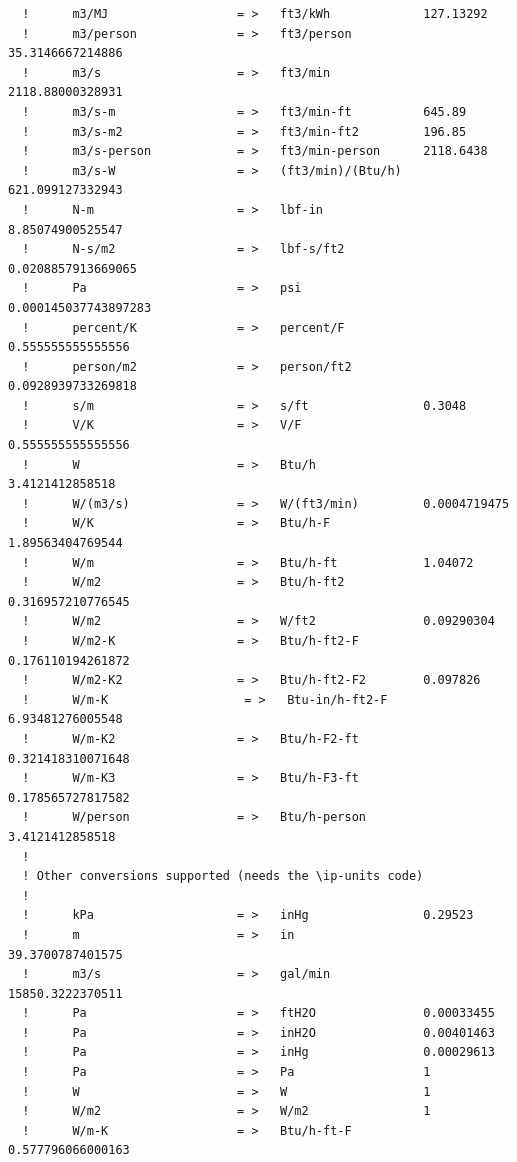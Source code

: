 \begin{lstlisting}
  !      m3/MJ                  = >   ft3/kWh             127.13292
  !      m3/person              = >   ft3/person          35.3146667214886
  !      m3/s                   = >   ft3/min             2118.88000328931
  !      m3/s-m                 = >   ft3/min-ft          645.89
  !      m3/s-m2                = >   ft3/min-ft2         196.85
  !      m3/s-person            = >   ft3/min-person      2118.6438
  !      m3/s-W                 = >   (ft3/min)/(Btu/h)   621.099127332943
  !      N-m                    = >   lbf-in              8.85074900525547
  !      N-s/m2                 = >   lbf-s/ft2           0.0208857913669065
  !      Pa                     = >   psi                 0.000145037743897283
  !      percent/K              = >   percent/F           0.555555555555556
  !      person/m2              = >   person/ft2          0.0928939733269818
  !      s/m                    = >   s/ft                0.3048
  !      V/K                    = >   V/F                 0.555555555555556
  !      W                      = >   Btu/h               3.4121412858518
  !      W/(m3/s)               = >   W/(ft3/min)         0.0004719475
  !      W/K                    = >   Btu/h-F             1.89563404769544
  !      W/m                    = >   Btu/h-ft            1.04072
  !      W/m2                   = >   Btu/h-ft2           0.316957210776545
  !      W/m2                   = >   W/ft2               0.09290304
  !      W/m2-K                 = >   Btu/h-ft2-F         0.176110194261872
  !      W/m2-K2                = >   Btu/h-ft2-F2        0.097826
  !      W/m-K                   = >   Btu-in/h-ft2-F      6.93481276005548
  !      W/m-K2                 = >   Btu/h-F2-ft         0.321418310071648
  !      W/m-K3                 = >   Btu/h-F3-ft         0.178565727817582
  !      W/person               = >   Btu/h-person        3.4121412858518
  !
  ! Other conversions supported (needs the \ip-units code)
  !
  !      kPa                    = >   inHg                0.29523
  !      m                      = >   in                  39.3700787401575
  !      m3/s                   = >   gal/min             15850.3222370511
  !      Pa                     = >   ftH2O               0.00033455
  !      Pa                     = >   inH2O               0.00401463
  !      Pa                     = >   inHg                0.00029613
  !      Pa                     = >   Pa                  1
  !      W                      = >   W                   1
  !      W/m2                   = >   W/m2                1
  !      W/m-K                  = >   Btu/h-ft-F          0.577796066000163

\end{lstlisting}
